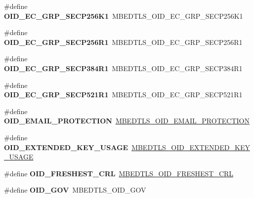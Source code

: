 \begin{DoxyCompactItemize}
\#define {\bfseries O\+I\+D\+\_\+\+E\+C\+\_\+\+G\+R\+P\+\_\+\+S\+E\+C\+P256\+K1}~M\+B\+E\+D\+T\+L\+S\+\_\+\+O\+I\+D\+\_\+\+E\+C\+\_\+\+G\+R\+P\+\_\+\+S\+E\+C\+P256\+K1
\item 
\mbox{\label{compat-1_83_8h_a88083d8105b275a95efa4d536e7ab930}} 
\#define {\bfseries O\+I\+D\+\_\+\+E\+C\+\_\+\+G\+R\+P\+\_\+\+S\+E\+C\+P256\+R1}~M\+B\+E\+D\+T\+L\+S\+\_\+\+O\+I\+D\+\_\+\+E\+C\+\_\+\+G\+R\+P\+\_\+\+S\+E\+C\+P256\+R1
\item 
\mbox{\label{compat-1_83_8h_ae99682dc4008c793b6aedb1053fc9178}} 
\#define {\bfseries O\+I\+D\+\_\+\+E\+C\+\_\+\+G\+R\+P\+\_\+\+S\+E\+C\+P384\+R1}~M\+B\+E\+D\+T\+L\+S\+\_\+\+O\+I\+D\+\_\+\+E\+C\+\_\+\+G\+R\+P\+\_\+\+S\+E\+C\+P384\+R1
\item 
\mbox{\label{compat-1_83_8h_a156c6ca3795576a9195383b373f4c63e}} 
\#define {\bfseries O\+I\+D\+\_\+\+E\+C\+\_\+\+G\+R\+P\+\_\+\+S\+E\+C\+P521\+R1}~M\+B\+E\+D\+T\+L\+S\+\_\+\+O\+I\+D\+\_\+\+E\+C\+\_\+\+G\+R\+P\+\_\+\+S\+E\+C\+P521\+R1
\item 
\mbox{\label{compat-1_83_8h_a7f40b357ba1da1ad58dd192279af8404}} 
\#define {\bfseries O\+I\+D\+\_\+\+E\+M\+A\+I\+L\+\_\+\+P\+R\+O\+T\+E\+C\+T\+I\+ON}~\mbox{\hyperlink{oid_8h_a96c02fe1530d4c737d2bf391cbd82f5e}{M\+B\+E\+D\+T\+L\+S\+\_\+\+O\+I\+D\+\_\+\+E\+M\+A\+I\+L\+\_\+\+P\+R\+O\+T\+E\+C\+T\+I\+ON}}
\item 
\mbox{\label{compat-1_83_8h_ae688ca38359585375550e6e36c885f8a}} 
\#define {\bfseries O\+I\+D\+\_\+\+E\+X\+T\+E\+N\+D\+E\+D\+\_\+\+K\+E\+Y\+\_\+\+U\+S\+A\+GE}~\mbox{\hyperlink{oid_8h_a19e9613b36efd1b1df43fb7da917b7f7}{M\+B\+E\+D\+T\+L\+S\+\_\+\+O\+I\+D\+\_\+\+E\+X\+T\+E\+N\+D\+E\+D\+\_\+\+K\+E\+Y\+\_\+\+U\+S\+A\+GE}}
\item 
\mbox{\label{compat-1_83_8h_a2248c46b5e5513449d02611fbced032f}} 
\#define {\bfseries O\+I\+D\+\_\+\+F\+R\+E\+S\+H\+E\+S\+T\+\_\+\+C\+RL}~\mbox{\hyperlink{oid_8h_a02b94a8cf5d24bf50eaf6452f605f384}{M\+B\+E\+D\+T\+L\+S\+\_\+\+O\+I\+D\+\_\+\+F\+R\+E\+S\+H\+E\+S\+T\+\_\+\+C\+RL}}
\item 
\mbox{\label{compat-1_83_8h_a3cbafaaea95caa8ecd557217ab9df35b}} 
\#define {\bfseries O\+I\+D\+\_\+\+G\+OV}~M\+B\+E\+D\+T\+L\+S\+\_\+\+O\+I\+D\+\_\+\+G\+OV

\end{DoxyCompactItemize}
